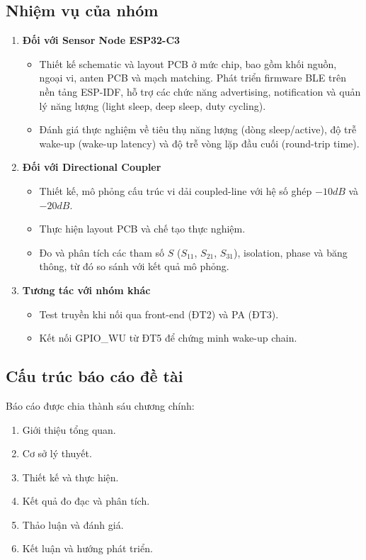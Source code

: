 \subsection{Nhiệm vụ của nhóm}

\begin{enumerate}[label=\arabic*)]
	\item \textbf{Đối với Sensor Node ESP32-C3}
		\begin{itemize}[label=-]
			\item Thiết kế schematic và layout PCB ở mức chip, bao gồm khối nguồn, ngoại vi, anten PCB và mạch matching.
			Phát triển firmware BLE trên nền tảng ESP-IDF, hỗ trợ các chức năng advertising, notification và quản lý năng lượng (light sleep, deep sleep, duty cycling).
			\item Đánh giá thực nghiệm về tiêu thụ năng lượng (dòng sleep/active), độ trễ wake-up (wake-up latency) và độ trễ vòng lặp đầu cuối (round-trip time).
		\end{itemize}
	\item \textbf{Đối với Directional Coupler}
		\begin{itemize}[label=-]
			\item Thiết kế, mô phỏng cấu trúc vi dải coupled-line với hệ số ghép $-10dB$ và $-20dB$.
			\item Thực hiện layout PCB và chế tạo thực nghiệm.
			\item Đo và phân tích các tham số $S$ ($S_{11}$, $S_{21}$, $S_{31}$), isolation, phase và băng thông, từ đó so sánh với kết quả mô phỏng.
		\end{itemize}
	\item \textbf{Tương tác với nhóm khác}
		\begin{itemize}[label=-]
			\item Test truyền khi nối qua front-end (ĐT2) và PA (ĐT3). 
			\item Kết nối GPIO\_WU từ ĐT5 để chứng minh wake-up chain.
		\end{itemize}
\end{enumerate}

\subsection{Cấu trúc báo cáo đề tài}

Báo cáo được chia thành sáu chương chính:

\begin{enumerate}[label=Chương \arabic*., leftmargin=*, align=left]
	\item Giới thiệu tổng quan.
	\item Cơ sở lý thuyết.
	\item Thiết kế và thực hiện.
	\item Kết quả đo đạc và phân tích.
	\item Thảo luận và đánh giá.
	\item Kết luận và hướng phát triển.
\end{enumerate}